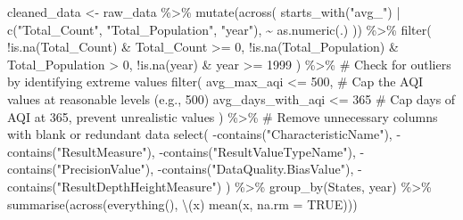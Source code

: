 \documentclass[
  12pt,
]{article}
\newenvironment{Shaded}{\begin{snugshade}}{\end{snugshade}}
\newcommand{\AttributeTok}[1]{\textcolor[rgb]{0.40,0.45,0.13}{#1}}
\newcommand{\CommentTok}[1]{\textcolor[rgb]{0.37,0.37,0.37}{#1}}
\newcommand{\ConstantTok}[1]{\textcolor[rgb]{0.56,0.35,0.01}{#1}}
\newcommand{\DecValTok}[1]{\textcolor[rgb]{0.68,0.00,0.00}{#1}}
\newcommand{\FunctionTok}[1]{\textcolor[rgb]{0.28,0.35,0.67}{#1}}
\newcommand{\NormalTok}[1]{\textcolor[rgb]{0.00,0.23,0.31}{#1}}
\newcommand{\OtherTok}[1]{\textcolor[rgb]{0.00,0.23,0.31}{#1}}
\newcommand{\SpecialCharTok}[1]{\textcolor[rgb]{0.37,0.37,0.37}{#1}}
\newcommand{\StringTok}[1]{\textcolor[rgb]{0.13,0.47,0.30}{#1}}
\begin{document}
\begin{Shaded}
\begin{Highlighting}[]
\NormalTok{cleaned\_data }\OtherTok{\textless{}{-}}\NormalTok{ raw\_data }\SpecialCharTok{\%\textgreater{}\%}
  \FunctionTok{mutate}\NormalTok{(}\FunctionTok{across}\NormalTok{(}
    \FunctionTok{starts\_with}\NormalTok{(}\StringTok{"avg\_"}\NormalTok{) }\SpecialCharTok{|} 
    \FunctionTok{c}\NormalTok{(}\StringTok{"Total\_Count"}\NormalTok{, }\StringTok{"Total\_Population"}\NormalTok{, }\StringTok{"year"}\NormalTok{), }
    \SpecialCharTok{\textasciitilde{}} \FunctionTok{as.numeric}\NormalTok{(.)}
\NormalTok{  )) }\SpecialCharTok{\%\textgreater{}\%}
  \FunctionTok{filter}\NormalTok{(}
    \SpecialCharTok{!}\FunctionTok{is.na}\NormalTok{(Total\_Count) }\SpecialCharTok{\&}\NormalTok{ Total\_Count }\SpecialCharTok{\textgreater{}=} \DecValTok{0}\NormalTok{,}
    \SpecialCharTok{!}\FunctionTok{is.na}\NormalTok{(Total\_Population) }\SpecialCharTok{\&}\NormalTok{ Total\_Population }\SpecialCharTok{\textgreater{}} \DecValTok{0}\NormalTok{,}
    \SpecialCharTok{!}\FunctionTok{is.na}\NormalTok{(year) }\SpecialCharTok{\&}\NormalTok{ year }\SpecialCharTok{\textgreater{}=} \DecValTok{1999}
\NormalTok{  ) }\SpecialCharTok{\%\textgreater{}\%}
  \CommentTok{\# Check for outliers by identifying extreme values}
  \FunctionTok{filter}\NormalTok{(}
\NormalTok{    avg\_max\_aqi }\SpecialCharTok{\textless{}=} \DecValTok{500}\NormalTok{,  }\CommentTok{\# Cap the AQI values at reasonable levels (e.g., 500)}
\NormalTok{    avg\_days\_with\_aqi }\SpecialCharTok{\textless{}=} \DecValTok{365}  \CommentTok{\# Cap days of AQI at 365, prevent unrealistic values}
\NormalTok{  ) }\SpecialCharTok{\%\textgreater{}\%}
  \CommentTok{\# Remove unnecessary columns with blank or redundant data}
  \FunctionTok{select}\NormalTok{(}
    \SpecialCharTok{{-}}\FunctionTok{contains}\NormalTok{(}\StringTok{"CharacteristicName"}\NormalTok{),}
    \SpecialCharTok{{-}}\FunctionTok{contains}\NormalTok{(}\StringTok{"ResultMeasure"}\NormalTok{),}
    \SpecialCharTok{{-}}\FunctionTok{contains}\NormalTok{(}\StringTok{"ResultValueTypeName"}\NormalTok{),}
    \SpecialCharTok{{-}}\FunctionTok{contains}\NormalTok{(}\StringTok{"PrecisionValue"}\NormalTok{),}
    \SpecialCharTok{{-}}\FunctionTok{contains}\NormalTok{(}\StringTok{"DataQuality.BiasValue"}\NormalTok{),}
    \SpecialCharTok{{-}}\FunctionTok{contains}\NormalTok{(}\StringTok{"ResultDepthHeightMeasure"}\NormalTok{)}
\NormalTok{  ) }\SpecialCharTok{\%\textgreater{}\%}
  \FunctionTok{group\_by}\NormalTok{(States, year) }\SpecialCharTok{\%\textgreater{}\%}
  \FunctionTok{summarise}\NormalTok{(}\FunctionTok{across}\NormalTok{(}\FunctionTok{everything}\NormalTok{(), \textbackslash{}(x) }\FunctionTok{mean}\NormalTok{(x, }\AttributeTok{na.rm =} \ConstantTok{TRUE}\NormalTok{)))}
\end{Highlighting}
\end{Shaded}
\end{document}
